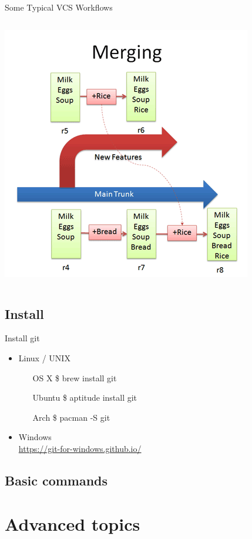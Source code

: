 \documentclass[10pt,xcolor=dvipsnames]{beamer}
\begin{document}
\begin{frame}{Some Typical VCS Workflows}
\begin{columns}
\pause
{\includegraphics [scale=0.3]{merging.png}}
\pause
\end{columns}
\end{frame}

\subsection{Install}

\begin{frame}{Install git}
\begin{itemize}
  \setlength\itemsep{0.4in}
   \item Linux / UNIX
     \begin{itemize}
       \item [OS X]\$ brew install git %
       \item[Ubuntu]\$ aptitude install git
       \item[Arch]\$ pacman -S git
     \end{itemize}
 \item Windows \\
\url{https://git-for-windows.github.io/}
\end{itemize}
\end{frame}

\subsection{Basic commands}

\section{Advanced topics}
\end{document}
